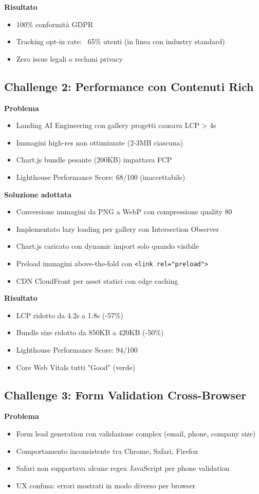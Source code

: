 \textbf{Risultato}
\begin{itemize}
  \item 100\% conformità GDPR
  \item Tracking opt-in rate: ~65\% utenti (in linea con industry 
        standard)
  \item Zero issue legali o reclami privacy
\end{itemize}

\subsection{Challenge 2: Performance con Contenuti Rich}
\textbf{Problema}
\begin{itemize}
  \item Landing AI Engineering con gallery progetti causava LCP > 4s
  \item Immagini high-res non ottimizzate (2-3MB ciascuna)
  \item Chart.js bundle pesante (200KB) impattava FCP
  \item Lighthouse Performance Score: 68/100 (inaccettabile)
\end{itemize}

\textbf{Soluzione adottata}
\begin{itemize}
  \item Conversione immagini da PNG a WebP con compressione quality 80
  \item Implementato lazy loading per gallery con Intersection Observer
  \item Chart.js caricato con dynamic import solo quando visibile
  \item Preload immagini above-the-fold con \texttt{<link rel="preload">}
  \item CDN CloudFront per asset statici con edge caching
\end{itemize}

\textbf{Risultato}
\begin{itemize}
  \item LCP ridotto da 4.2s a 1.8s (-57\%)
  \item Bundle size ridotto da 850KB a 420KB (-50\%)
  \item Lighthouse Performance Score: 94/100
  \item Core Web Vitals tutti "Good" (verde)
\end{itemize}

\subsection{Challenge 3: Form Validation Cross-Browser}
\textbf{Problema}
\begin{itemize}
  \item Form lead generation con validazione complex (email, phone, 
        company size)
  \item Comportamento inconsistente tra Chrome, Safari, Firefox
  \item Safari non supportava alcune regex JavaScript per phone validation
  \item UX confusa: errori mostrati in modo diverso per browser
\end{itemize}

